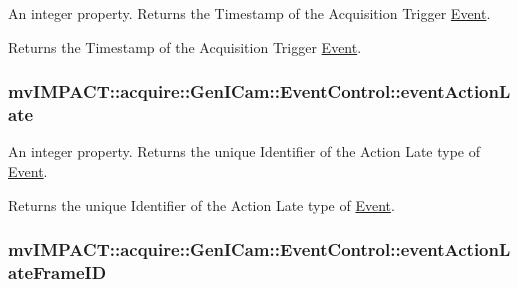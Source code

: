An integer property. Returns the Timestamp of the Acquisition Trigger \hyperlink{classmv_i_m_p_a_c_t_1_1acquire_1_1_event}{Event}. 

Returns the Timestamp of the Acquisition Trigger \hyperlink{classmv_i_m_p_a_c_t_1_1acquire_1_1_event}{Event}. \hypertarget{classmv_i_m_p_a_c_t_1_1acquire_1_1_gen_i_cam_1_1_event_control_a26a3e024f3e6fe2ed85460b541705bc9}{
\subsubsection[{event\+Action\+Late}]{ mv\+I\+M\+P\+A\+C\+T\+::acquire\+::\+Gen\+I\+Cam\+::\+Event\+Control\+::event\+Action\+Late}}\label{classmv_i_m_p_a_c_t_1_1acquire_1_1_gen_i_cam_1_1_event_control_a26a3e024f3e6fe2ed85460b541705bc9}


An integer property. Returns the unique Identifier of the Action Late type of \hyperlink{classmv_i_m_p_a_c_t_1_1acquire_1_1_event}{Event}. 

Returns the unique Identifier of the Action Late type of \hyperlink{classmv_i_m_p_a_c_t_1_1acquire_1_1_event}{Event}. \hypertarget{classmv_i_m_p_a_c_t_1_1acquire_1_1_gen_i_cam_1_1_event_control_afb1ffcd41f45ee86d5438b9c507cb229}{
\subsubsection[{event\+Action\+Late\+Frame\+I\+D}]{ mv\+I\+M\+P\+A\+C\+T\+::acquire\+::\+Gen\+I\+Cam\+::\+Event\+Control\+::event\+Action\+Late\+Frame\+I\+D}}\label{classmv_i_m_p_a_c_t_1_1acquire_1_1_gen_i_cam_1_1_event_control_afb1ffcd41f45ee86d5438b9c507cb229}


